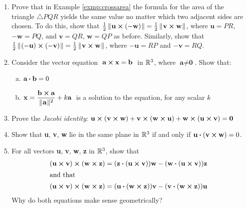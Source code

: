 \begin{enumerate}[\bfseries 1.]
[{[\bfseries 1.]}]
 \item Prove that in Example \ref{exmp:crossarea} the formula for the area of the triangle $\triangle PQR$ yields the
  same value no matter which two adjacent sides are chosen. To do this, show that
  $\frac{1}{2}\,\lVert\mspace{1mu}\textbf{u} \bm{\times} (-\textbf{w})\mspace{1mu}\rVert = \frac{1}{2}\,\lVert\mspace{1mu}\textbf{v} \bm{\times} \textbf{w}\mspace{1mu}\rVert$,
  where $\textbf{u} = PR$, $-\textbf{w} = PQ$, and $\textbf{v} = QR$, $\textbf{w} = QP$ as before. Similarly, show that
  $\frac{1}{2}\,\lVert\mspace{1mu}(-\textbf{u}) \bm{\times} (-\textbf{v})\mspace{1mu}\rVert =
  \frac{1}{2}\,\lVert\mspace{1mu}\textbf{v} \bm{\times} \textbf{w}\mspace{1mu}\rVert$, where $-\textbf{u} = RP$ and $-\textbf{v} = RQ$.
 \item Consider the vector equation $\thickspace\textbf{a} \bm{\times} \textbf{x} = \textbf{b}\thickspace$
  in $\mathbb{R}^{3}$, where $\textbf{a} \ne \textbf{0}$. Show that:
  \begin{enumerate}[(a)]
   \item $\textbf{a} \bm{\cdot} \textbf{b} = 0$
   \item $\textbf{x} = \dfrac{\textbf{b} \bm{\times} \textbf{a}}{\lVert\mspace{1mu}\textbf{a}\mspace{1mu}\rVert^2} + k \textbf{a}\thickspace$
   is a solution to the equation, for any scalar $k$
  \end{enumerate}
 \item Prove the \emph{Jacobi identity}:
  $\textbf{u} \bm{\times} (\textbf{v} \bm{\times} \textbf{w}) +
  \textbf{v} \bm{\times} (\textbf{w} \bm{\times} \textbf{u}) +
  \textbf{w} \bm{\times} (\textbf{u} \bm{\times} \textbf{v}) = \textbf{0}$
 \item Show that \textbf{u}, \textbf{v}, \textbf{w} lie in the same plane in $\mathbb{R}^{3}$ if and only if
  $\textbf{u} \bm{\cdot} (\textbf{v} \bm{\times} \textbf{w}) = 0$.
 \item For all vectors \textbf{u}, \textbf{v}, \textbf{w}, \textbf{z} in $\mathbb{R}^{3}$, show that
  \begin{align*}
   (\textbf{u} \bm{\times} \textbf{v}) \bm{\times} (\textbf{w} \bm{\times} \textbf{z}) &=
    (\textbf{z} \bm{\cdot} (\textbf{u} \bm{\times} \textbf{v}))\textbf{w} -
    (\textbf{w} \bm{\cdot} (\textbf{u} \bm{\times} \textbf{v}))\textbf{z}\\
   \intertext{and that}
   (\textbf{u} \bm{\times} \textbf{v}) \bm{\times} (\textbf{w} \bm{\times} \textbf{z}) &=
    (\textbf{u} \bm{\cdot} (\textbf{w} \bm{\times} \textbf{z}))\textbf{v} -
    (\textbf{v} \bm{\cdot} (\textbf{w} \bm{\times} \textbf{z}))\textbf{u}
  \end{align*}
  Why do both equations make sense geometrically?
\end{enumerate}
\newpage
